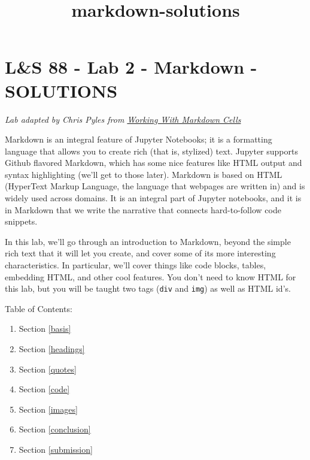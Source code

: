 \documentclass[11pt]{article}
\title{markdown-solutions}
\providecommand{\tightlist}{%
      \setlength{\itemsep}{0pt}\setlength{\parskip}{0pt}}
\begin{document}
    
    
    \maketitle
    
    

    
    \hypertarget{ls-88---lab-2---markdown---solutions}{%
\section{L\&S 88 - Lab 2 - Markdown -
SOLUTIONS}\label{ls-88---lab-2---markdown---solutions}}

\emph{Lab adapted by Chris Pyles from
\href{https://github.com/jupyter/notebook/blob/master/docs/source/examples/Notebook/Working\%20With\%20Markdown\%20Cells.ipynb}{Working
With Markdown Cells}}

Markdown is an integral feature of Jupyter Notebooks; it is a formatting
language that allows you to create rich (that is, stylized) text.
Jupyter supports Github flavored Markdown, which has some nice features
like HTML output and syntax highlighting (we'll get to those later).
Markdown is based on HTML (HyperText Markup Language, the language that
webpages are written in) and is widely used across domains. It is an
integral part of Jupyter notebooks, and it is in Markdown that we write
the narrative that connects hard-to-follow code snippets.

In this lab, we'll go through an introduction to Markdown, beyond the
simple rich text that it will let you create, and cover some of its more
interesting characteristics. In particular, we'll cover things like code
blocks, tables, embedding HTML, and other cool features. You don't need
to know HTML for this lab, but you will be taught two tags (\texttt{div}
and \texttt{img}) as well as HTML id's.

Table of Contents:

\begin{enumerate}
\def\labelenumi{\arabic{enumi}.}
\tightlist
\item
  Section \ref{basis}
\item
  Section \ref{headings}
\item
  Section \ref{quotes}
\item
  Section \ref{code}
\item
  Section \ref{images}
\item
  Section \ref{conclusion}
\item
  Section \ref{submission}
\end{enumerate}
\end{document}
